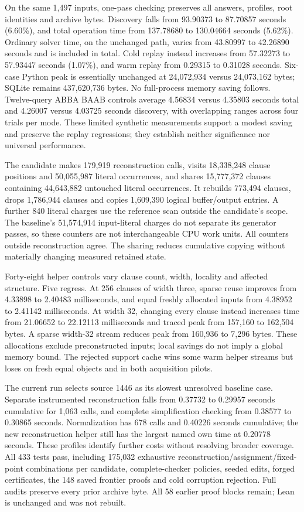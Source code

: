 \documentclass[11pt,a4paper]{article}
\numberwithin{equation}{section}
\theoremstyle{plain}
\theoremstyle{definition}
\theoremstyle{remark}
\begin{document}
On the same 1,497 inputs, one-pass checking preserves all answers, profiles, root identities and archive bytes. Discovery falls from 93.90373 to 87.70857 seconds (6.60\%), and total operation time from 137.78680 to 130.04664 seconds (5.62\%). Ordinary solver time, on the unchanged path, varies from 43.80997 to 42.26890 seconds and is included in total. Cold replay instead increases from 57.32273 to 57.93447 seconds (1.07\%), and warm replay from 0.29315 to 0.31028 seconds. Six-case Python peak is essentially unchanged at 24,072,934 versus 24,073,162 bytes; SQLite remains 437,620,736 bytes. No full-process memory saving follows. Twelve-query ABBA BAAB controls average 4.56834 versus 4.35803 seconds total and 4.26007 versus 4.03725 seconds discovery, with overlapping ranges across four trials per mode. These limited synthetic measurements support a modest saving and preserve the replay regressions; they establish neither significance nor universal performance.

The candidate makes 179,919 reconstruction calls, visits 18,338,248 clause positions and 50,055,987 literal occurrences, and shares 15,777,372 clauses containing 44,643,882 untouched literal occurrences. It rebuilds 773,494 clauses, drops 1,786,944 clauses and copies 1,609,390 logical buffer/output entries. A further 840 literal charges use the reference scan outside the candidate's scope. The baseline's 51,574,914 input-literal charges do not separate its generator passes, so these counters are not interchangeable CPU work units. All counters outside reconstruction agree. The sharing reduces cumulative copying without materially changing measured retained state.

Forty-eight helper controls vary clause count, width, locality and affected structure. Five regress. At 256 clauses of width three, sparse reuse improves from 4.33898 to 2.40483 milliseconds, and equal freshly allocated inputs from 4.38952 to 2.41142 milliseconds. At width 32, changing every clause instead increases time from 21.06652 to 22.12113 milliseconds and traced peak from 157,160 to 162,504 bytes. A sparse width-32 stream reduces peak from 160,936 to 7,296 bytes. These allocations exclude preconstructed inputs; local savings do not imply a global memory bound. The rejected support cache wins some warm helper streams but loses on fresh equal objects and in both acquisition pilots.

The current run selects source 1446 as its slowest unresolved baseline case. Separate instrumented reconstruction falls from 0.37732 to 0.29957 seconds cumulative for 1,063 calls, and complete simplification checking from 0.38577 to 0.30865 seconds. Normalization has 678 calls and 0.40226 seconds cumulative; the new reconstruction helper still has the largest named own time at 0.20778 seconds. These profiles identify further costs without resolving broader coverage. All 433 tests pass, including 175,032 exhaustive reconstruction/assignment/fixed-point combinations per candidate, complete-checker policies, seeded edits, forged certificates, the 148 saved frontier proofs and cold corruption rejection. Full audits preserve every prior archive byte. All 58 earlier proof blocks remain; Lean is unchanged and was not rebuilt.
\end{document}
